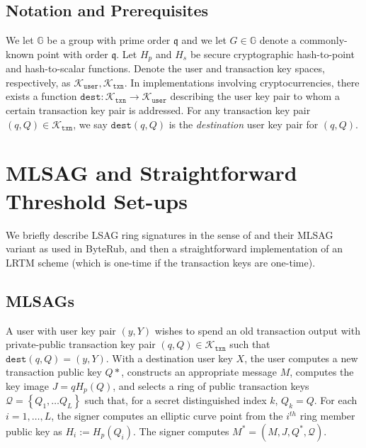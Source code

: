 \documentclass{mrl}
\theoremstyle{definition}
\begin{document}
\subsection{Notation and Prerequisites}

We let $\mathbb{G}$ be a group with prime order $\mathfrak{q}$ and we let $G \in \mathbb{G}$ denote a commonly-known point with order $\mathfrak{q}$. Let $H_p$ and $H_s$ be secure cryptographic hash-to-point and hash-to-scalar functions. Denote the user and transaction key spaces, respectively, as $\mathcal{K}_{\texttt{user}}, \mathcal{K}_{\texttt{txn}}$. In implementations involving cryptocurrencies, there exists a function $\texttt{dest}:\mathcal{K}_{\texttt{txn}} \to \mathcal{K}_{\texttt{user}}$ describing the user key pair to whom a certain transaction key pair is addressed. For any transaction key pair $(q,Q) \in \mathcal{K}_{\texttt{txn}}$, we say $\texttt{dest}(q,Q)$ is the \textit{destination} user key pair for $(q,Q)$. %


\section{MLSAG and Straightforward Threshold Set-ups}


We briefly describe LSAG ring signatures in the sense of \cite{liu2004linkable} and their MLSAG variant as used in ByteRub, and then a straightforward implementation of an LRTM scheme (which is one-time if the transaction keys are one-time). 

\subsection{MLSAGs}

A user with user key pair $(y,Y)$ wishes to spend an old transaction output with private-public transaction key pair $(q,Q) \in \mathcal{K}_{\texttt{txn}}$ such that $\texttt{dest}(q,Q) = (y,Y)$. With a destination user key $X$, the user computes a new transaction public key $Q*$, constructs an appropriate message $M$, computes the key image $J = qH_p(Q)$, and selects a ring of public transaction keys $\mathcal{Q}=\left\{Q_1, \ldots Q_L\right\}$ such that, for a secret distinguished index $k$, $Q_{k}=Q$. For each $i=1,\ldots,L$, the signer computes an elliptic curve point from the $i^{th}$ ring member public key  as $H_i := H_{p}(Q_i)$. The signer computes $M^* = (M, J, Q^*, \mathcal{Q})$.
\end{document}
